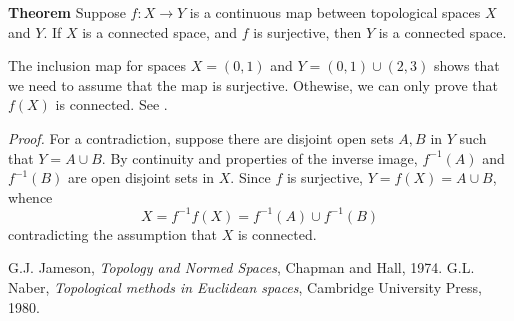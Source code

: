 \documentclass[12pt]{article}
\begin{document}
{\bf Theorem}
Suppose $f\colon X\to Y$ is a continuous map
between topological spaces $X$ and $Y$.
If $X$ is a connected space, and $f$ is surjective,
then $Y$ is a connected space.

The inclusion map for spaces $X=(0,1)$ and $Y=(0,1)\cup(2,3)$ shows
that we need to assume that the map is surjective. Othewise,
we can only prove that $f(X)$ is connected.
See .

\emph{Proof.} 
For a contradiction, suppose there
are disjoint open sets $A,B$ in $Y$ such that $Y=A\cup B$.
By continuity and propertie{s} of the inverse image,
$f^{-1}(A)$ and $f^{-1}(B)$ are open disjoint sets in $X$.
Since $f$ is surjective, $Y=f(X)=A\cup B$, whence
$$
  X=f^{-1}f(X) = f^{-1}(A)\cup f^{-1}(B)
$$
contradicting the assumption that $X$ is connected.

\begin{thebibliography}{9}
 G.J. Jameson, \emph{Topology and Normed Spaces},
Chapman and Hall, 1974.
 G.L. Naber, \emph{Topological methods in Euclidean spaces},
Cambridge University Press, 1980.
\end{thebibliography}
\end{document}
